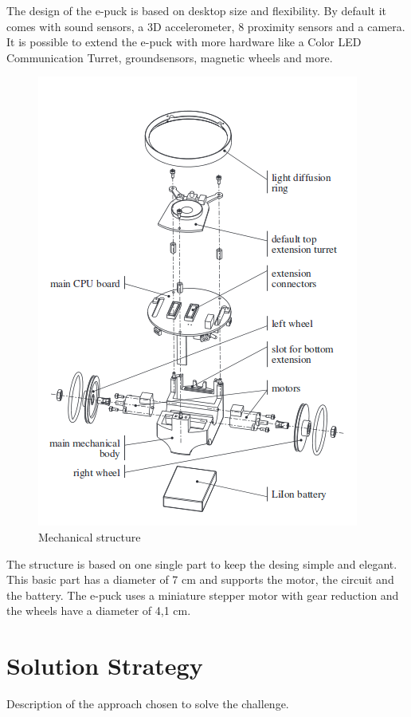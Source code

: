 \documentclass[12pt,a4paper]{article}
\begin{document}
The design of the e-puck is based on desktop size and flexibility. By default it comes with sound sensors, a 3D accelerometer, 8 proximity sensors and a camera. It is possible to extend the e-puck with more hardware like a Color LED Communication Turret, groundsensors, magnetic wheels and more.

\begin{figure}[h!]
\begin{center}
\includegraphics[scale=0.5]{images/epuck-concept.png}
\caption{Mechanical structure}
\label{fig:epuck structure}
\end{center}
\end{figure} 
The structure is based on one single part to keep the desing simple and elegant. This basic part has a diameter of 7 cm and supports the motor, the circuit and the battery. The e-puck uses a miniature stepper motor with gear reduction and the wheels have a diameter of 4,1 cm.

\section{Solution Strategy} \label{sec:solStrategy}
Description of the approach chosen to solve the challenge.
\end{document}
